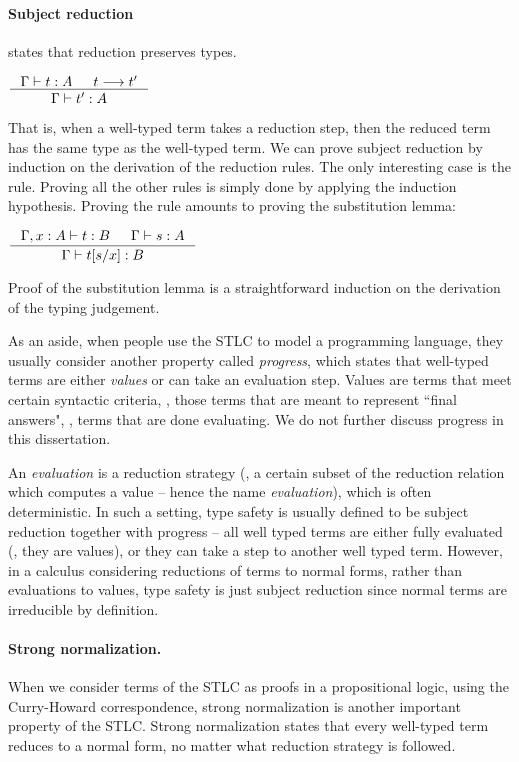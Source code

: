 \paragraph{Subject reduction}\hspace{-1em}
states that reduction preserves types.
\begin{theorem}
        $\inference{\Gamma |- t : A  & t --> t'}{\Gamma |- t' : A}$
\end{theorem}
That is, when a well-typed term takes a reduction step, then the reduced term
has the same type as the well-typed term. We can prove subject reduction
by induction on the derivation of the reduction rules.
The only interesting case is the  rule. Proving all
the other rules is simply done by applying the induction hypothesis.
Proving the  rule amounts to proving the substitution lemma:
\begin{lemma}[substitution]
$ \inference{\Gamma,x:A |- t : B  & \Gamma |- s : A}{\Gamma |- t[s/x] : B} $
\end{lemma}
Proof of the substitution lemma is a straightforward induction on
the derivation of the typing judgement.

As an aside, when people use the STLC to model a programming language,
they usually consider another property called \emph{progress},
which states that well-typed terms are either {\em values} or
can take an evaluation step. 
Values are terms that meet certain syntactic criteria, \ie, those terms
that are meant to represent ``final answers", \ie, terms that
are done evaluating. We do not further discuss progress in this dissertation.

An {\em evaluation} is a reduction strategy
(\ie, a certain subset of the reduction relation which computes a value --
hence the name {\em evaluation}), which is often deterministic.
In such a setting, type safety is usually defined to be subject reduction
together with progress -- all well typed terms are either fully evaluated
(\ie, they are values), or they can take a step to another well typed term.
However, in a calculus considering reductions of terms to normal forms,
rather than evaluations to values, type safety is just subject reduction
since normal terms are irreducible by definition.

\paragraph{Strong normalization.} 
When we consider terms of the STLC as proofs in a propositional logic,
using the Curry-Howard correspondence, strong normalization
is another important property of the STLC. Strong normalization states
that every well-typed term reduces to a normal form, no matter what
reduction strategy is followed.

